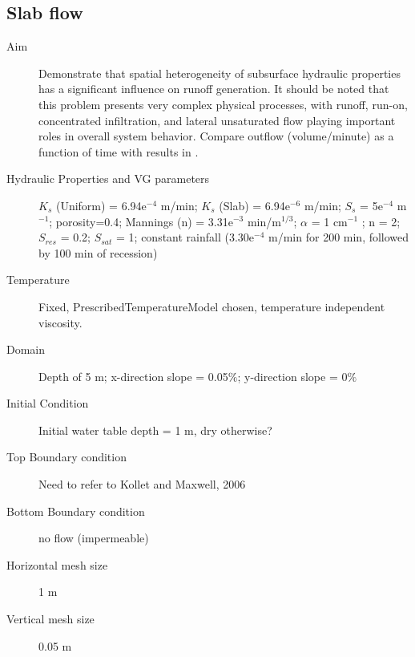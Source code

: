 \documentclass[twoside,10pt]{report}
\begin{document}
\subsection{Slab flow}
\begin{description}
\item [Aim] Demonstrate that spatial heterogeneity of subsurface hydraulic properties has a significant influence on runoff generation. It should be noted that this problem presents very complex physical processes, with runoff, run-on, concentrated infiltration, and lateral unsaturated flow playing important roles in overall system behavior. Compare outflow (volume/minute) as a function of time with results in \citet{Maxwell14a}.
\item [Hydraulic Properties and VG parameters] $K_s$ (Uniform) = 6.94e$^{-4}$ m/min; $K_s$ (Slab) = 6.94e$^{-6}$ m/min; $S_s$ = 5e$^{-4}$ m$^{-1}$; porosity=0.4; Mannings (n) = 3.31e$^{-3}$ min/m$^{1/3}$; $\alpha$  = 1 cm$^{-1}$ ; n = 2; $S_{res}$ = 0.2; $S_{sat}$ = 1; constant rainfall (3.30e$^{-4}$ m/min for 200 min, followed by 100 min of recession)
\item [Temperature] Fixed, PrescribedTemperatureModel chosen, temperature independent viscosity.
\item [Domain] Depth of 5 m;  x-direction slope = 0.05$\%$; y-direction slope = 0$\%$
\item [Initial Condition] Initial water table depth = 1 m, dry otherwise?
\item [Top Boundary condition] Need to refer to Kollet and Maxwell, 2006
\item [Bottom Boundary condition] no flow (impermeable)
\item [Horizontal mesh size] 1 m
\item [Vertical mesh size] 0.05 m
\end{description}
\end{document}
